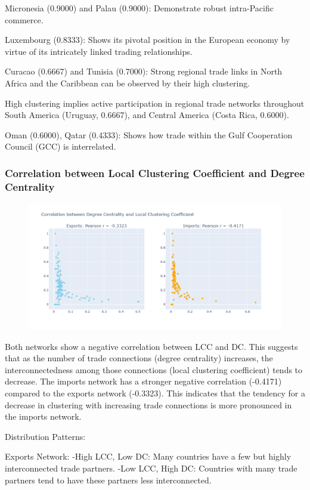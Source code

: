 \documentclass[12pt, a4paper]{article}
\begin{document}
Micronesia (0.9000) and Palau (0.9000): Demonstrate robust intra-Pacific commerce.

Luxembourg (0.8333): Shows its pivotal position in the European economy by virtue of its intricately linked trading relationships.

Curacao (0.6667) and Tunisia (0.7000): Strong regional trade links in North Africa and the Caribbean can be observed by their high clustering.

High clustering implies active participation in regional trade networks throughout South America (Uruguay, 0.6667), and Central America (Costa Rica, 0.6000).

Oman (0.6000), Qatar (0.4333): Shows how trade within the Gulf Cooperation Council (GCC) is interrelated.
\subsubsection{Correlation between Local Clustering Coefficient and Degree Centrality}
\begin{figure}[ht]
\centering
\includegraphics[width=\textwidth]{img/correlation.png}
\label{fig:importlcc}
\end{figure}
Both networks show a negative correlation between LCC and DC. This suggests that as the number of trade connections (degree centrality) increases, the interconnectedness among those connections (local clustering coefficient) tends to decrease. The imports network has a stronger negative correlation (-0.4171) compared to the exports network (-0.3323). This indicates that the tendency for a decrease in clustering with increasing trade connections is more pronounced in the imports network.

Distribution Patterns:

Exports Network: -High LCC, Low DC: Many countries have a few but highly interconnected trade partners. -Low LCC, High DC: Countries with many trade partners tend to have these partners less interconnected.
\end{document}
